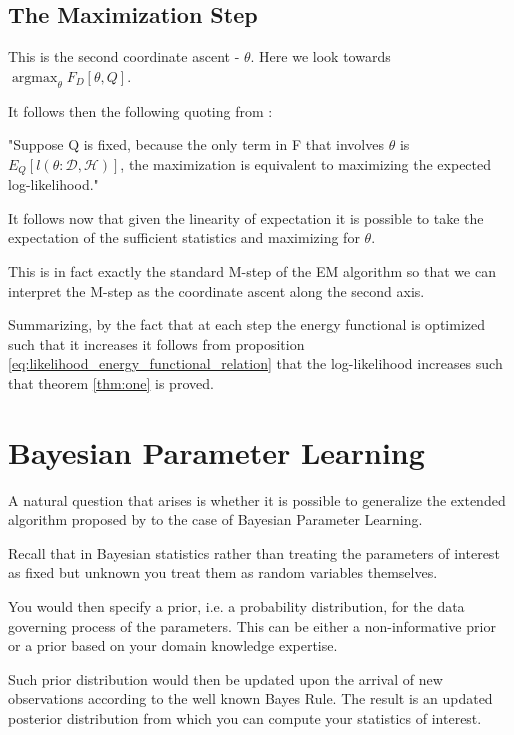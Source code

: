 \documentclass[11pt]{article}
\begin{document}
\begin{article}
\subsection{The Maximization Step}
\label{sec:orgfc0f498}

This is the second coordinate ascent - \(\theta\). Here we look
towards \(\operatorname*{argmax}_{\theta} F_D[\theta, Q]\).

It follows then the following quoting from
\cite{koller2009probabilistic}:

"Suppose Q is fixed, because the only term in F that involves \(\theta\) is
\(E_Q[l (\theta: \mathscr{D}, \mathscr{H})]\), the maximization is
equivalent to maximizing the expected log-likelihood."

It follows now that given the linearity of expectation it is
possible to take the expectation of the sufficient statistics and
maximizing for \(\theta\).

This is in fact exactly the standard M-step of the EM algorithm so
that we can interpret the M-step as the coordinate ascent along
the second axis. 

Summarizing, by the fact that at each step the energy functional is
optimized such that it increases it follows from proposition
\ref{eq:likelihood_energy_functional_relation} that the
log-likelihood increases such that theorem \ref{thm:one} is proved.


\section{Bayesian Parameter Learning}
\label{sec:orgdfa1a7a}

A natural question that arises is whether it is possible to
generalize the extended algorithm proposed by \cite{Mrad_2015} to the
case of Bayesian Parameter Learning.

Recall that in Bayesian statistics rather than treating the
parameters of interest as fixed but unknown you treat them as random
variables themselves.

You would then specify a prior, i.e. a probability distribution, for
the data governing process of the parameters. This can be either a
non-informative prior or a prior based on your domain knowledge
expertise.

Such prior distribution would then be updated upon the arrival of
new observations according to the well known Bayes Rule. The result
is an updated posterior distribution from which you can compute your
statistics of interest.



\end{article}
\end{document}
